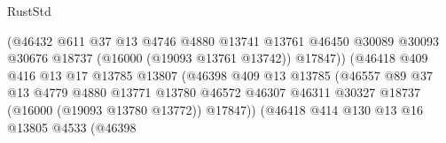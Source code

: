 \begin{lexlean}{RustStd}
\begin{coremodule}
                                            (@46432
                                              @611
                                              @37
                                              @13
                                              @4746
                                              @4880
                                              @13741
                                              @13761
                                              @46450
                                              @30089
                                              @30093
                                              @30676
                                              @18737
                                              (@16000 (@19093 @13761 @13742))
                                              @17847))
                                          (@46418
                                            @409
                                            @416
                                            @13
                                            @17
                                            @13785
                                            @13807
                                            (@46398
                                              @409
                                              @13
                                              @13785
                                              (@46557
                                                @89
                                                @37
                                                @13
                                                @4779
                                                @4880
                                                @13771
                                                @13780
                                                @46572
                                                @46307
                                                @46311
                                                @30327
                                                @18737
                                                (@16000 (@19093 @13780 @13772))
                                                @17847))
                                            (@46418
                                              @414
                                              @130
                                              @13
                                              @16
                                              @13805
                                              @4533
                                              (@46398

\end{coremodule}
\end{lexlean}
